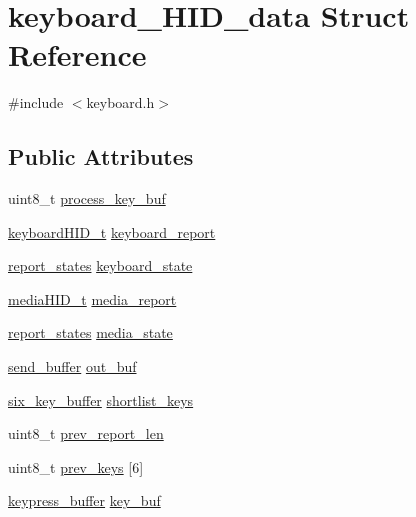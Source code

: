 \hypertarget{structkeyboard__HID__data}{}\section{keyboard\+\_\+\+H\+I\+D\+\_\+data Struct Reference}
\label{structkeyboard__HID__data}


{\ttfamily \#include $<$keyboard.\+h$>$}

\subsection*{Public Attributes}
\begin{DoxyCompactItemize}
\item 
uint8\+\_\+t \hyperlink{structkeyboard__HID__data_ac6ff0934ffaa8af4a7357fa9c262f610}{process\+\_\+key\+\_\+buf}
\item 
\hyperlink{keyboard_8h_ae363bda14329c2fd40dea1b02411741a}{keyboard\+H\+I\+D\+\_\+t} \hyperlink{structkeyboard__HID__data_a00c66ed8ebc503cf1266ff8261f64d0c}{keyboard\+\_\+report}
\item 
\hyperlink{states_8h_a97ae098857b45ee4ac9f7ae3a41a7aff}{report\+\_\+states} \hyperlink{structkeyboard__HID__data_a5cc61600ba30d39b829d21187d97c74c}{keyboard\+\_\+state}
\item 
\hyperlink{keyboard_8h_aeca50d10ea64df413e422cf38eab9cd9}{media\+H\+I\+D\+\_\+t} \hyperlink{structkeyboard__HID__data_aeaf1a6f8022be4e979a747412abc5d20}{media\+\_\+report}
\item 
\hyperlink{states_8h_a97ae098857b45ee4ac9f7ae3a41a7aff}{report\+\_\+states} \hyperlink{structkeyboard__HID__data_a93abdb2e65e86baa42983d4e25dfcfe3}{media\+\_\+state}
\item 
\hyperlink{structsend__buffer}{send\+\_\+buffer} \hyperlink{structkeyboard__HID__data_a2ae73fbdabbfa5bb56f3c97f3a361780}{out\+\_\+buf}
\item 
\hyperlink{structsix__key__buffer}{six\+\_\+key\+\_\+buffer} \hyperlink{structkeyboard__HID__data_a984ec97a0da585ce6818a3860748eb36}{shortlist\+\_\+keys}
\item 
uint8\+\_\+t \hyperlink{structkeyboard__HID__data_aa9ecfbfca2446bbfbeffbb0ac5d9f157}{prev\+\_\+report\+\_\+len}
\item 
uint8\+\_\+t \hyperlink{structkeyboard__HID__data_a3b701758e410ae765778b87007821d42}{prev\+\_\+keys} \mbox{[}6\mbox{]}
\item 
\hyperlink{structkeypress__buffer}{keypress\+\_\+buffer} \hyperlink{structkeyboard__HID__data_aa889358beccd6c8bd16c58b7f277b94a}{key\+\_\+buf}
\end{DoxyCompactItemize}


